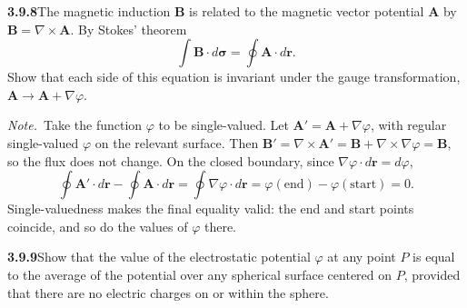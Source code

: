 \par\bigskip
\noindent\textbf{3.9.8}\quad The magnetic induction $\mathbf{B}$ is related to
the magnetic vector potential $\mathbf{A}$ by
$\mathbf{B}=\nabla\times\mathbf{A}$. By Stokes' theorem
\[
\int\mathbf{B}\cdot d\boldsymbol{\sigma}
=\oint\mathbf{A}\cdot d\mathbf{r}.
\]
Show that each side of this equation is invariant under the gauge
transformation, $\mathbf{A}\to\mathbf{A}+\nabla\varphi$.

\emph{Note.}~Take the function $\varphi$ to be single-valued.
\solution
Let $\mathbf A'=\mathbf A+\nabla\varphi$, with regular single-valued
$\varphi$ on the relevant surface. Then
$\mathbf B'=\nabla\times\mathbf A'
=\mathbf B+\nabla\times\nabla\varphi=\mathbf B$,
so the flux does not change.
On the closed boundary, since $\nabla\varphi\cdot d\mathbf r=d\varphi$,
\[
\oint\mathbf A'\cdot d\mathbf r-\oint\mathbf A\cdot d\mathbf r
=\oint\nabla\varphi\cdot d\mathbf r
=\varphi(\text{end})-\varphi(\text{start})=0.
\]
Single-valuedness makes the final equality valid: the end and start
points coincide, and so do the values of $\varphi$ there.

\par\bigskip
\noindent\textbf{3.9.9}\quad Show that the value of the electrostatic
potential $\varphi$ at any point $P$ is equal to the average of the potential
over any spherical surface centered on $P$, provided that there are no
electric charges on or within the sphere.

